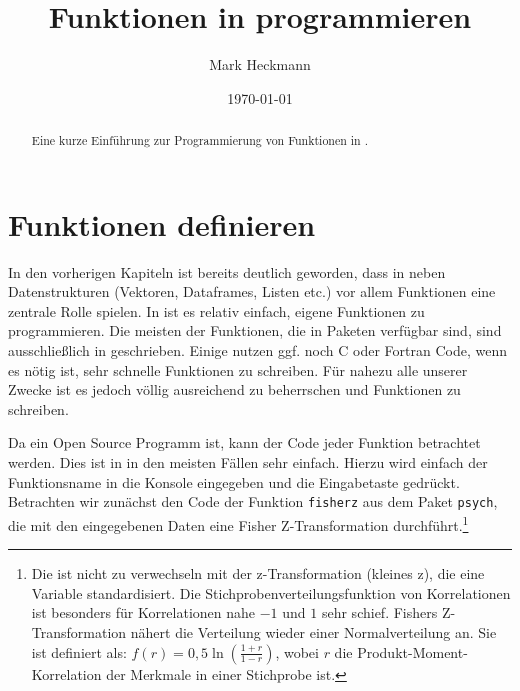 \documentclass[12pt, a4paper,twoside,openany,x11names,svgnames]{memoir}
\begin{document}





\setcounter{tocdepth}{3}

\title{Funktionen in \R{} programmieren} 
\author{Mark Heckmann} 

\date{\today}

\maketitle

 \begin{abstract}
Eine kurze Einführung zur Programmierung von Funktionen in \R{}.
\end{abstract}


\begin{singlespace}
\tableofcontents
\end{singlespace}


\section{Funktionen definieren}

In den vorherigen Kapiteln ist bereits deutlich geworden, dass in \R{} neben  Datenstrukturen (Vektoren, Dataframes, Listen etc.) vor allem Funktionen eine zentrale Rolle spielen. In \R{} ist es relativ einfach, eigene Funktionen zu programmieren. Die meisten der Funktionen, die in Paketen verfügbar sind, sind ausschließlich in \R{} geschrieben. Einige nutzen ggf. noch C oder Fortran Code, wenn es nötig ist, sehr schnelle Funktionen zu schreiben. Für nahezu alle unserer Zwecke ist es jedoch völlig ausreichend \R{} zu beherrschen und \R{} Funktionen zu schreiben.

Da \R{} ein Open Source Programm ist, kann der Code jeder Funktion betrachtet werden. Dies ist in \R{} in den meisten Fällen sehr einfach. Hierzu wird einfach der Funktionsname in die Konsole eingegeben und die Eingabetaste gedrückt. Betrachten wir zunächst den Code der Funktion \texttt{fisherz} aus dem Paket \texttt{psych}, die mit den eingegebenen Daten eine Fisher Z-Transformation durchführt.\footnote{Die ist nicht zu verwechseln mit der z-Transformation (kleines z), die eine Variable standardisiert. Die Stichprobenverteilungsfunktion von Korrelationen ist besonders für Korrelationen nahe $-1$ und $1$ sehr schief. Fishers Z-Transformation nähert die Verteilung wieder einer Normalverteilung an. Sie ist definiert als: $f(r)=0{,}5\ln\left(\frac{1+r}{1-r}\right)$, wobei $r$ die Produkt-Moment-Korrelation der Merkmale in einer Stichprobe ist.}
\end{document}

